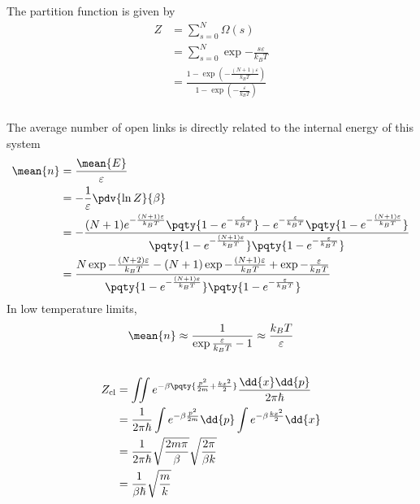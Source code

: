 \documentclass[12pt]{article}
\begin{document}
        The partition function is given by \begin{align*}
            Z &= \sum_{s = 0}^{N}\Omega(s)\\
            &= \sum_{s = 0}^{N}\exp{ - \frac{s\varepsilon}{k_BT}}\\
            &= \frac{1 - \exp( -\frac{(N + 1)\varepsilon}{k_BT} )}{1 -\exp( -\frac{\varepsilon}{k_BT})}
        \end{align*}
        \subsubsection{} The average number of open links is directly related to the internal energy of this system
        \begin{align*}
            \mean{n} &= \frac{\mean{E}}{\varepsilon} \\
            &= -\frac{1}{\varepsilon} \pdv{\ln Z}{\beta }\\
            &= - \frac{{{(N + 1)}  e^{ -\frac{(N + 1)\varepsilon}{k_BT} }}\pqty{1 - e^{ -\frac{\varepsilon}{k_BT}}} - {  e^{ -\frac{\varepsilon}{k_BT}}}\pqty{1 -  e^{ -\frac{(N + 1)\varepsilon}{k_BT} }}}{ \pqty{1 -  e^{ -\frac{(N + 1)\varepsilon}{k_BT} }}\pqty{1 - e^{ -\frac{\varepsilon}{k_BT}}}}\\
            &=  \frac{N\exp{ -\frac{(N + 2)\varepsilon}{k_BT}} -(N + 1)\exp{ -\frac{(N + 1)\varepsilon}{k_BT}} + \exp{ - \frac{\varepsilon}{k_BT}}}{{ \pqty{1 -  e^{ -\frac{(N + 1)\varepsilon}{k_BT} }}\pqty{1 - e^{ -\frac{\varepsilon}{k_BT}}}}}
        \end{align*}
        In low temperature limits,
        \[
            \mean{n} \approx \frac{1}{\exp{\frac{\varepsilon}{k_BT}} - 1} \approx \frac{k_BT}{\varepsilon}
        \]
        \subsection{} \subsubsection{} { 
        \begin{align*}
            Z_\text{cl} &=  \iint e^{-\beta \pqty{\frac{p^2}{2m} + \frac{kx^2}{2}}} \frac{\dd{x} \dd{p}}{2\pi\hbar} \\
            &= \frac{1}{2\pi\hbar} \int e^{-\beta \frac{p^2}{2m}} \dd{p} \int e^{-\beta \frac{kx^2}{2}}  \dd{x}\\
            &= \frac{1}{2\pi\hbar} \sqrt{\frac{2m\pi}{\beta }} \sqrt{\frac{2\pi}{\beta k}}\\
            &= \frac{1}{\beta \hbar} \sqrt{\frac{m}{k}}
        \end{align*}}
\end{document}
